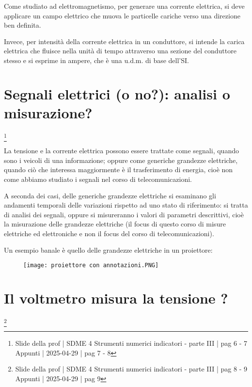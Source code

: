 Come studiato ad elettromagnetismo, per generare una corrente elettrica, si deve applicare un campo elettrico che muova 
le particelle cariche verso una direzione ben definita. \newline 

Invece, per intensità della corrente elettrica in un conduttore, si intende la carica elettrica che fluisce nella unità 
di tempo attraverso una sezione del conduttore stesso e si esprime in ampere, che è una u.d.m. di base dell'SI. \newline 

\newpage 

\section{Segnali elettrici (o no?): analisi o misurazione?}
\footnote{Slide della prof | SDME 4 Strumenti numerici indicatori - parte III | pag 6 - 7 \\  
Appunti | 2025-04-29 | pag 7 - 8}


La tensione e la corrente elettrica possono essere trattate come segnali, quando sono i veicoli di una informazione; 
oppure come generiche grandezze elettriche, quando ciò che interessa maggiormente è il trasferimento di energia, 
cioè non come abbiamo studiato i segnali nel corso di telecomunicazioni. \newline 

A seconda dei casi, delle generiche grandezze elettriche si esaminano gli andamenti temporali delle variazioni rispetto ad uno stato 
di riferimento: si tratta di analisi dei segnali, 
oppure si misureranno i valori di parametri descrittivi, cioè la misurazione delle grandezze elettriche  
(il focus di questo corso di misure elettriche ed elettroniche e non il focus del corso di telecomunicazioni). \newline 

Un esempio banale è quello delle grandezze elettriche in un proiettore: 

\begin{figure}[h]
    \centering
    \texttt{[image: proiettore con annotazioni.PNG]}
\end{figure}

\newpage 

\section{Il voltmetro misura la tensione ?}
\footnote{Slide della prof | SDME 4 Strumenti numerici indicatori - parte III | pag  8 - 9\\  
Appunti | 2025-04-29 | pag 9}

